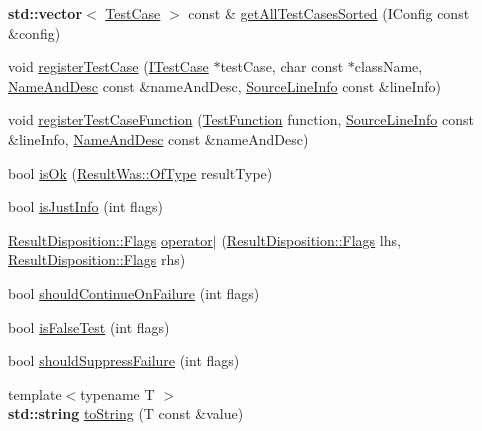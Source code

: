 \begin{DoxyCompactItemize}
\item 
\textbf{ std\+::vector}$<$ \hyperlink{class_catch_1_1_test_case}{Test\+Case} $>$ const  \& \hyperlink{namespace_catch_a1c9b1a23bc947ea70ddaabf067276cf2}{get\+All\+Test\+Cases\+Sorted} (I\+Config const \&config)
\item 
void \hyperlink{namespace_catch_a9a59d681cc327a33c280796561dfe258}{register\+Test\+Case} (\hyperlink{struct_catch_1_1_i_test_case}{I\+Test\+Case} $\ast$test\+Case, char const $\ast$class\+Name, \hyperlink{struct_catch_1_1_name_and_desc}{Name\+And\+Desc} const \&name\+And\+Desc, \hyperlink{struct_catch_1_1_source_line_info}{Source\+Line\+Info} const \&line\+Info)
\item 
void \hyperlink{namespace_catch_a220159aeff47f9c5231e893f2abbc643}{register\+Test\+Case\+Function} (\hyperlink{namespace_catch_a26414f52d0835939fae52aadd27e6257}{Test\+Function} function, \hyperlink{struct_catch_1_1_source_line_info}{Source\+Line\+Info} const \&line\+Info, \hyperlink{struct_catch_1_1_name_and_desc}{Name\+And\+Desc} const \&name\+And\+Desc)
\item 
bool \hyperlink{namespace_catch_a5205869c81c06d3460759cb86676ae68}{is\+Ok} (\hyperlink{struct_catch_1_1_result_was_a624e1ee3661fcf6094ceef1f654601ef}{Result\+Was\+::\+Of\+Type} result\+Type)
\item 
bool \hyperlink{namespace_catch_a54b01af61673a3e1f21f31713639b180}{is\+Just\+Info} (int flags)
\item 
\hyperlink{struct_catch_1_1_result_disposition_a3396cad6e2259af326b3aae93e23e9d8}{Result\+Disposition\+::\+Flags} \hyperlink{namespace_catch_ab32a083e442cc09f736327d2e2865999}{operator$\vert$} (\hyperlink{struct_catch_1_1_result_disposition_a3396cad6e2259af326b3aae93e23e9d8}{Result\+Disposition\+::\+Flags} lhs, \hyperlink{struct_catch_1_1_result_disposition_a3396cad6e2259af326b3aae93e23e9d8}{Result\+Disposition\+::\+Flags} rhs)
\item 
bool \hyperlink{namespace_catch_a7f7480b15d74965459c844f0d393ed87}{should\+Continue\+On\+Failure} (int flags)
\item 
bool \hyperlink{namespace_catch_a93ef4e3e307a2021ca0d41b32c0e54b0}{is\+False\+Test} (int flags)
\item 
bool \hyperlink{namespace_catch_ab91eb13081203d634fe48d3d2ab386d7}{should\+Suppress\+Failure} (int flags)
\item 
{\footnotesize template$<$typename T $>$ }\\\textbf{ std\+::string} \hyperlink{namespace_catch_adbd1730f961da94d9ed284f70fd7a28b}{to\+String} (T const  \&value)

\end{DoxyCompactItemize}

